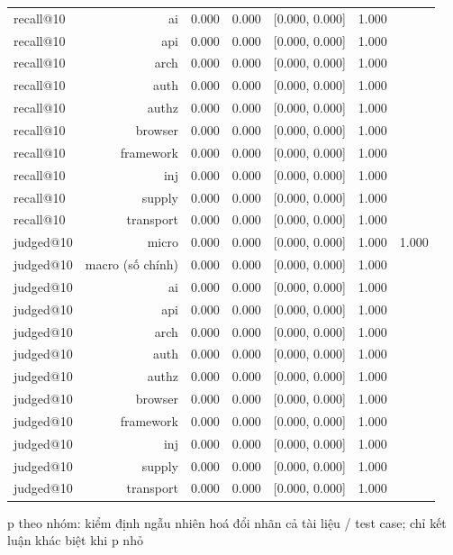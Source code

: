 \begin{table}[ht]
\begin{tabular}{lrrrrrr}
recall@10 & ai & 0.000 & 0.000 & [0.000, 0.000] & 1.000 &  \\
recall@10 & api & 0.000 & 0.000 & [0.000, 0.000] & 1.000 &  \\
recall@10 & arch & 0.000 & 0.000 & [0.000, 0.000] & 1.000 &  \\
recall@10 & auth & 0.000 & 0.000 & [0.000, 0.000] & 1.000 &  \\
recall@10 & authz & 0.000 & 0.000 & [0.000, 0.000] & 1.000 &  \\
recall@10 & browser & 0.000 & 0.000 & [0.000, 0.000] & 1.000 &  \\
recall@10 & framework & 0.000 & 0.000 & [0.000, 0.000] & 1.000 &  \\
recall@10 & inj & 0.000 & 0.000 & [0.000, 0.000] & 1.000 &  \\
recall@10 & supply & 0.000 & 0.000 & [0.000, 0.000] & 1.000 &  \\
recall@10 & transport & 0.000 & 0.000 & [0.000, 0.000] & 1.000 &  \\
judged@10 & micro & 0.000 & 0.000 & [0.000, 0.000] & 1.000 & 1.000 \\
judged@10 & macro (số chính) & 0.000 & 0.000 & [0.000, 0.000] & 1.000 &  \\
judged@10 & ai & 0.000 & 0.000 & [0.000, 0.000] & 1.000 &  \\
judged@10 & api & 0.000 & 0.000 & [0.000, 0.000] & 1.000 &  \\
judged@10 & arch & 0.000 & 0.000 & [0.000, 0.000] & 1.000 &  \\
judged@10 & auth & 0.000 & 0.000 & [0.000, 0.000] & 1.000 &  \\
judged@10 & authz & 0.000 & 0.000 & [0.000, 0.000] & 1.000 &  \\
judged@10 & browser & 0.000 & 0.000 & [0.000, 0.000] & 1.000 &  \\
judged@10 & framework & 0.000 & 0.000 & [0.000, 0.000] & 1.000 &  \\
judged@10 & inj & 0.000 & 0.000 & [0.000, 0.000] & 1.000 &  \\
judged@10 & supply & 0.000 & 0.000 & [0.000, 0.000] & 1.000 &  \\
judged@10 & transport & 0.000 & 0.000 & [0.000, 0.000] & 1.000 &  \\
\bottomrule
\end{tabular}
\par\smallskip\footnotesize p theo nhóm: kiểm định ngẫu nhiên hoá đổi nhãn cả tài liệu / test case; chỉ kết luận khác biệt khi p nhỏ
\end{table}

